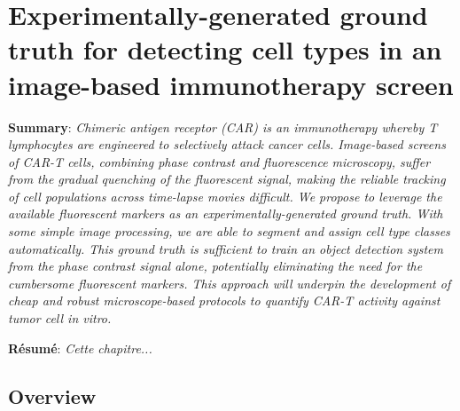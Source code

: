 
\chapter{Experimentally-generated ground truth for detecting cell types in an image-based immunotherapy screen} %

\label{Chapter4} %


\textbf{Summary}: \emph{Chimeric antigen receptor (CAR) is an immunotherapy whereby T lymphocytes are engineered to selectively attack cancer cells. Image-based screens of CAR-T cells, combining phase contrast and fluorescence microscopy, suffer from the gradual quenching of the fluorescent signal, making the reliable tracking of cell populations across time-lapse movies difficult. We propose to leverage the available fluorescent markers as an experimentally-generated ground truth. With some simple image processing, we are able to segment and assign cell type classes automatically. This ground truth is sufficient to train an object detection system from the phase contrast signal alone, potentially eliminating the need for the cumbersome fluorescent markers. This approach will underpin the development of cheap and robust microscope-based protocols to quantify CAR-T activity against tumor cell in vitro.}

\textbf{R\'esum\'e}: \emph{Cette chapitre...}

\section{Overview}

